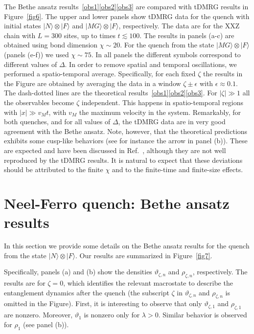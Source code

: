 \documentclass[twocolumn,superscriptaddress,prb,10pt]{revtex4-1}
\begin{document}
The Bethe ansatz results~\eqref{obs1}\eqref{obs2}\eqref{obs3} are compared with tDMRG results in 
Figure~\ref{fig6}. The upper and lower panels show tDMRG data for the quench with initial 
states $|N\rangle\otimes|F\rangle$ and $|MG\rangle\otimes|F\rangle$, respectively. The data 
are for the XXZ chain with $L=300$ sites, up to times $t\lesssim 100$. The 
results in panels (a-c) are obtained using bond dimension $\chi\sim 20$. For the quench 
from the state $|MG\rangle\otimes|F\rangle$ (panels (e-f)) we 
used $\chi\sim 75$. In all panels the different symbols correspond to different values of $\Delta$. 
In order to remove spatial and temporal oscillations, we performed 
a spatio-temporal average. Specifically, for each fixed $\zeta$ the results in the Figure are obtained by averaging 
the data in a window $\zeta\pm\epsilon$ with $\epsilon\approx 0.1$. The dash-dotted lines are the theoretical 
results~\eqref{obs1}\eqref{obs2}\eqref{obs3}. For $|\zeta|\gg1$ all the observables become $\zeta$ independent. 
This happens in spatio-temporal regions with $|x|\gg v_Mt$, with $v_M$ the maximum velocity in 
the system. Remarkably, for both quenches, and for all values of $\Delta$, the tDMRG data are in 
very good agreement with the Bethe ansatz. Note, however, that the theoretical predictions 
exhibits some cusp-like behaviors (see for instance the arrow in 
panel (b)). These are expected and have been discussed in Ref.~, 
although they are not well reproduced by the tDMRG results. It is natural to expect that 
these deviations should be attributed to the finite $\chi$ and to the finite-time and finite-size 
effects. 




\section{Neel-Ferro quench: Bethe ansatz results} 
\label{neel-ferro}

In this section we provide some details on the Bethe ansatz results 
for the quench from the state $|N\rangle\otimes|F\rangle$. 
Our results are summarized in Figure~\ref{fig7}. 

Specifically, panels (a) and (b) show the densities $\vartheta_{\zeta,n}$ 
and $\rho_{\zeta,n}$, respectively. The results are for $\zeta=0$, 
which identifies the relevant macrostate to describe the entanglement dynamics after the 
quench (the subscript $\zeta$ in $\vartheta_{\zeta,n}$ and $\rho_{\zeta,n}$ 
is omitted in the Figure). First, it is interesting to observe 
that only $\vartheta_{\zeta,1}$ and $\rho_{\zeta,1}$ are nonzero. Moreover, 
$\vartheta_1$ is nonzero only for $\lambda>0$. Similar behavior is observed 
for $\rho_1$ (see panel (b)). 
\end{document}
